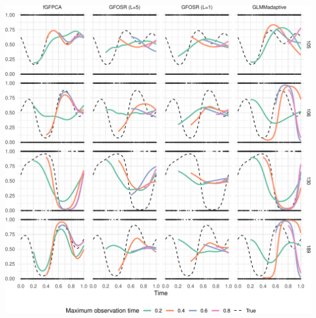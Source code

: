 \documentclass[
]{article}
\begin{document}
\includegraphics{manuscript_files/figure-latex/fig_small_sim_paper-1.pdf}
\end{document}
